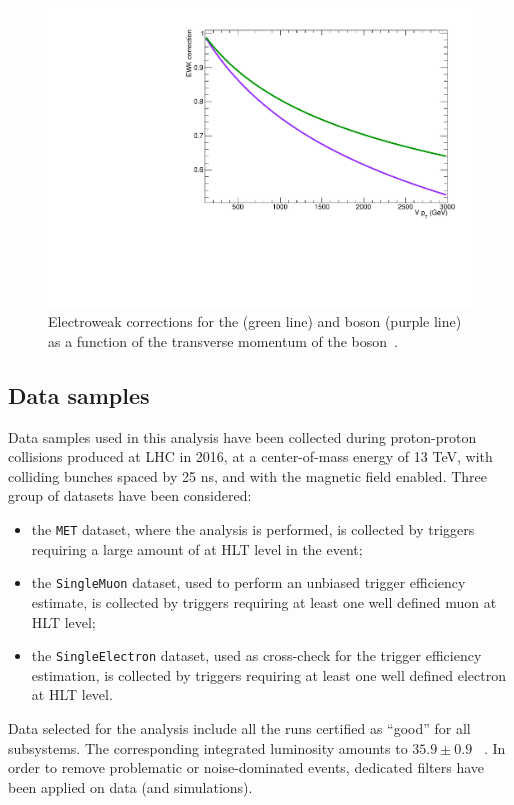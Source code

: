 \begin{figure}[!htb]
 \centering
   \includegraphics[width=.495\textwidth]{figures/EWK.pdf}
 \caption{Electroweak corrections for the \Z (green line) and \W boson (purple line) as a function of the transverse momentum of the boson~\cite{Kallweit:2015fta}.}
 \label{fig:ewk}
\end{figure}



\subsection{Data samples}
\label{sec:data}

Data samples used in this analysis have been collected during proton-proton collisions produced at LHC in 2016, at a center-of-mass energy of 13 TeV, with colliding bunches spaced by 25 ns, and with the magnetic field enabled. Three group of datasets have been considered:
\begin{itemize}
\item the {\tt MET} dataset, where the analysis is performed, is collected by triggers requiring a large amount of \met at HLT level in the event;
\item the {\tt SingleMuon} dataset, used to perform an unbiased trigger efficiency estimate, is collected by triggers requiring at least one well defined muon at HLT level;
\item the {\tt SingleElectron} dataset, used as cross-check for the trigger efficiency estimation, is collected by triggers requiring at least one well defined electron at HLT level.
\end{itemize}

\noindent Data selected for the analysis include all the runs certified as ``good'' for all subsystems. The corresponding integrated luminosity amounts to $35.9 \pm 0.9$ \fbinv~\cite{CMS:2017sdi}. In order to remove problematic or noise-dominated events, dedicated \MET filters have been applied on data (and simulations).

